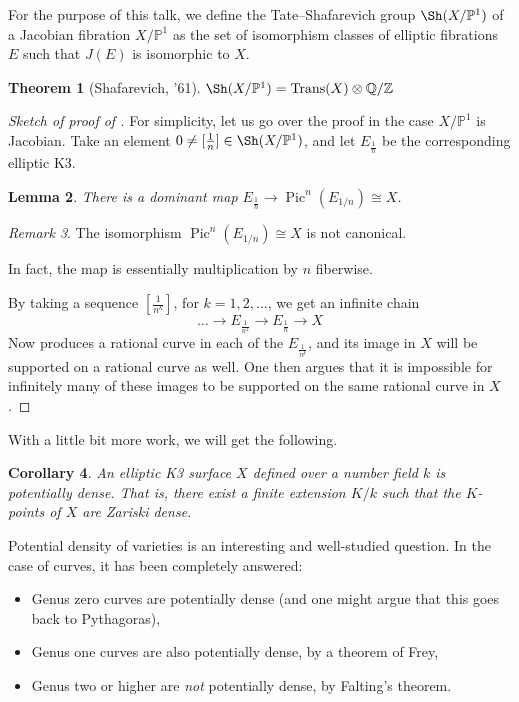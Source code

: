 \documentclass{amsart}
\theoremstyle{plain}
\newtheorem{theorem}{Theorem}[section]
\newtheorem{lemma}[theorem]{Lemma}
\newtheorem{corollary}[theorem]{Corollary}
\theoremstyle{definition}
\theoremstyle{remark}
\newtheorem{remark}[theorem]{Remark}
\DeclareMathOperator{\Pic}{Pic}
\DeclareMathOperator{\Trans}{Trans}
\DeclareMathOperator{\Sha}{ \Sh }
\begin{document}
For the purpose of this talk, we define the Tate--Shafarevich group $\Sha(X/\mathbb{P}^1)$ of 
a Jacobian fibration $X/\mathbb{P}^1$ as the set of isomorphism classes of elliptic fibrations
$E$ such that $J(E)$ is isomorphic to $X$.

\begin{theorem}[Shafarevich, '61]
$\Sha(X/\mathbb{P}^1)=\Trans(X) \otimes \mathbb{Q}/\mathbb{Z}$
\end{theorem} 


\begin{proof}[Sketch of proof of ]
For simplicity, let us go over the proof in the case $X/\mathbb{P}^1$ is Jacobian. Take
an element $0\neq [\frac{1}{n}] \in \Sha(X/\mathbb{P}^1)$, and let $E_{\frac{1}{n}}$ be the corresponding 
elliptic K3.
\begin{lemma}
There is a dominant map  $E_{\frac{1}{n}} \to \Pic^n(E_{1/n}) \cong X$.
\end{lemma}
\begin{remark}
The isomorphism $\Pic^n(E_{1/n}) \cong X$ is not canonical.
\end{remark}
In fact, the map is essentially multiplication by $n$ fiberwise.

By taking a sequence $[\frac{1}{n^k}]$, for $k=1,2,\ldots$, we get an infinite chain
\[
	\ldots  \to E_{\frac{1}{n^2}} \to E_{\frac{1}{n}} \to X
\]
Now  produces a rational curve in each of the $E_{\frac{1}{n^k}}$, and 
its image in $X$ will be supported on a rational curve as well. One then argues that it is impossible for infinitely many of these images to be supported on the same rational curve in $X$.
\end{proof}

With a little bit more work, we will get the following.
\begin{corollary}
\label{corollary:potential-density}
An elliptic K3 surface $X$ defined over a number field $k$ is potentially dense. That is,
there exist a finite extension $K/k$ such that the $K$-points of $X$ are Zariski dense.
\end{corollary}
Potential density of varieties is an interesting and well-studied question. In the case of curves, 
it has been completely answered:
\begin{itemize}
	\item Genus zero curves are potentially dense (and one might argue that this goes back to
	Pythagoras),
	\item Genus one curves are also potentially dense, by a theorem of Frey,
	\item Genus two or higher are \emph{not} potentially dense, by Falting's theorem. 
\end{itemize}
\end{document}
